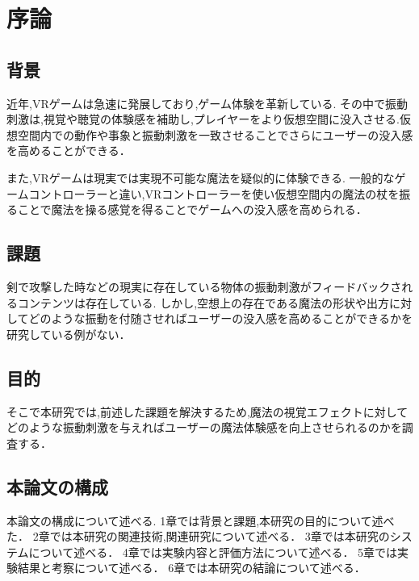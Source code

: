 \chapter{序論}
\section{背景}
近年,VRゲームは急速に発展しており,ゲーム体験を革新している.
その中で振動刺激は,視覚や聴覚の体験感を補助し,プレイヤーをより仮想空間に没入させる.仮想空間内での動作や事象と振動刺激を一致させることでさらにユーザーの没入感を高めることができる．

また,VRゲームは現実では実現不可能な魔法を疑似的に体験できる.
一般的なゲームコントローラーと違い,VRコントローラーを使い仮想空間内の魔法の杖を振ることで魔法を操る感覚を得ることでゲームへの没入感を高められる．

\section{課題}
剣で攻撃した時などの現実に存在している物体の振動刺激がフィードバックされるコンテンツは存在している.
しかし,空想上の存在である魔法の形状や出方に対してどのような振動を付随させればユーザーの没入感を高めることができるかを研究している例がない．
\section{目的}
そこで本研究では,前述した課題を解決するため,魔法の視覚エフェクトに対してどのような振動刺激を与えればユーザーの魔法体験感を向上させられるのかを調査する．

\section{本論文の構成}
本論文の構成について述べる.
1章では背景と課題,本研究の目的について述べた．
2章では本研究の関連技術,関連研究について述べる．
3章では本研究のシステムについて述べる．
4章では実験内容と評価方法について述べる．
5章では実験結果と考察について述べる．
6章では本研究の結論について述べる．




\begin{comment}
    \textblockcolour{PowderBlue}
    \begin{textblock}{10}(6.5, 15.8)
        見出しの深さの最大値は研究室や分野によって異なる。
        
        教員の指示に従うこと。一般論として4段は深すぎ？
    \end{textblock}
\end{comment}
